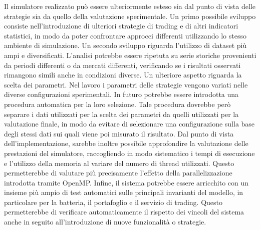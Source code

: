 \documentclass[a4paper,oneside,italian]{sapthesis}
\begin{document}
Il simulatore realizzato può essere ulteriormente esteso sia dal punto di vista delle
strategie sia da quello della valutazione sperimentale.
Un primo possibile sviluppo consiste nell'introduzione di ulteriori strategie di trading
e di altri indicatori statistici, in modo da poter confrontare approcci differenti
utilizzando lo stesso ambiente di simulazione.
Un secondo sviluppo riguarda l'utilizzo di dataset più ampi e diversificati. L'analisi
potrebbe essere ripetuta su serie storiche provenienti da periodi differenti o da mercati
differenti, verificando se i risultati osservati rimangono simili anche in condizioni diverse.
Un ulteriore aspetto riguarda la scelta dei parametri. Nel lavoro i parametri delle strategie
vengono variati nelle diverse configurazioni sperimentali. In futuro potrebbe essere introdotta
una procedura automatica per la loro selezione. Tale procedura dovrebbe però separare i dati
utilizzati per la scelta dei parametri da quelli utilizzati per la valutazione finale, in modo
da evitare di selezionare una configurazione sulla base degli stessi dati sui quali viene poi
misurato il risultato.
Dal punto di vista dell'implementazione, sarebbe inoltre possibile approfondire la valutazione
delle prestazioni del simulatore, raccogliendo in modo sistematico i tempi di esecuzione e
l'utilizzo della memoria al variare del numero di thread utilizzati. Questo permetterebbe di valutare
più precisamente l'effetto della parallelizzazione introdotta tramite OpenMP.
Infine, il sistema potrebbe essere arricchito con un insieme più ampio di test automatici sulle
principali invarianti del modello, in particolare per la batteria, il portafoglio e il servizio
di trading. Questo permetterebbe di verificare automaticamente il rispetto dei vincoli del sistema
anche in seguito all'introduzione di nuove funzionalità o strategie.

\backmatter
\cleardoublepage
{}
{}


\end{document}
